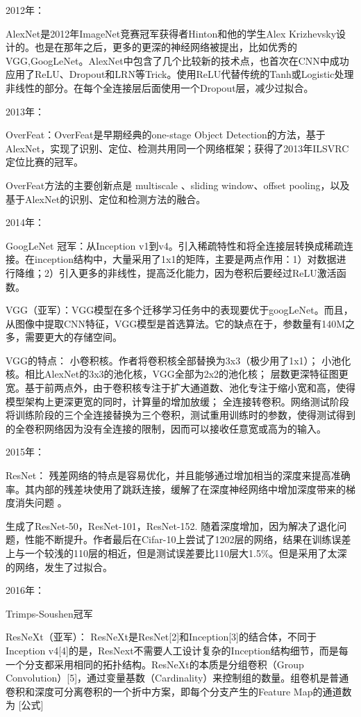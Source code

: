 \documentclass[openbib]{article}
\begin{document}
2012年：

AlexNet是2012年ImageNet竞赛冠军获得者Hinton和他的学生Alex Krizhevsky设计的。也是在那年之后，更多的更深的神经网络被提出，比如优秀的VGG,GoogLeNet。AlexNet中包含了几个比较新的技术点，也首次在CNN中成功应用了ReLU、Dropout和LRN等Trick。使用ReLU代替传统的Tanh或Logistic处理非线性的部分。在每个全连接层后面使用一个Dropout层，减少过拟合。

2013年：

OverFeat：OverFeat是早期经典的one-stage Object Detection的方法，基于AlexNet，实现了识别、定位、检测共用同一个网络框架；获得了2013年ILSVRC定位比赛的冠军。

OverFeat方法的主要创新点是 multiscale 、sliding window、offset pooling，以及基于AlexNet的识别、定位和检测方法的融合。

2014年：

GoogLeNet 冠军：从Inception v1到v4。引入稀疏特性和将全连接层转换成稀疏连接。在inception结构中，大量采用了1x1的矩阵，主要是两点作用：1）对数据进行降维；2）引入更多的非线性，提高泛化能力，因为卷积后要经过ReLU激活函数。

VGG（亚军）：VGG模型在多个迁移学习任务中的表现要优于googLeNet。而且，从图像中提取CNN特征，VGG模型是首选算法。它的缺点在于，参数量有140M之多，需要更大的存储空间。

VGG的特点：
小卷积核。作者将卷积核全部替换为3x3（极少用了1x1）；
小池化核。相比AlexNet的3x3的池化核，VGG全部为2x2的池化核；
层数更深特征图更宽。基于前两点外，由于卷积核专注于扩大通道数、池化专注于缩小宽和高，使得模型架构上更深更宽的同时，计算量的增加放缓；
全连接转卷积。网络测试阶段将训练阶段的三个全连接替换为三个卷积，测试重用训练时的参数，使得测试得到的全卷积网络因为没有全连接的限制，因而可以接收任意宽或高为的输入。

2015年：

ResNet：
残差网络的特点是容易优化，并且能够通过增加相当的深度来提高准确率。其内部的残差块使用了跳跃连接，缓解了在深度神经网络中增加深度带来的梯度消失问题 。

生成了ResNet-50，ResNet-101，ResNet-152. 随着深度增加，因为解决了退化问题，性能不断提升。作者最后在Cifar-10上尝试了1202层的网络，结果在训练误差上与一个较浅的110层的相近，但是测试误差要比110层大1.5\%。但是采用了太深的网络，发生了过拟合。

2016年：

Trimps-Soushen冠军

ResNeXt（亚军）：
ResNeXt是ResNet[2]和Inception[3]的结合体，不同于Inception v4[4]的是，ResNext不需要人工设计复杂的Inception结构细节，而是每一个分支都采用相同的拓扑结构。ResNeXt的本质是分组卷积（Group Convolution）[5]，通过变量基数（Cardinality）来控制组的数量。组卷机是普通卷积和深度可分离卷积的一个折中方案，即每个分支产生的Feature Map的通道数为 [公式]
\end{document}
